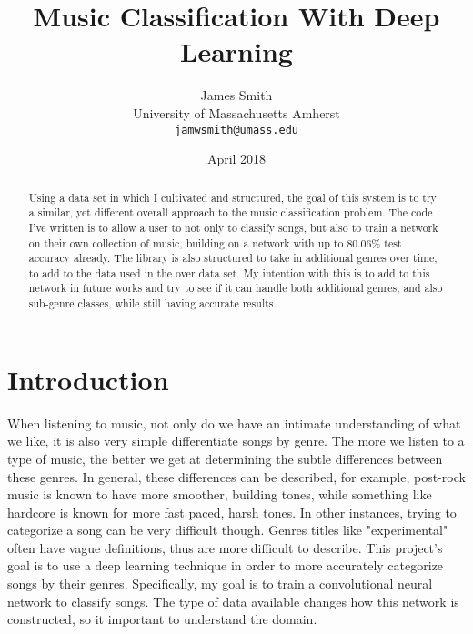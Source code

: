 \documentclass[10pt,twocolumn,letterpaper]{article}
\begin{document}
\title{Music Classification With Deep Learning}
\date{April 2018}

\author{James Smith\\
University of Massachusetts Amherst\\
{\tt\small jamwsmith@umass.edu}
}

\maketitle
\begin{abstract}
   Using a data set in which I cultivated and structured, the goal of this system is to try a similar, yet different overall approach to the music classification problem. The code I've written is to allow a user to not only to classify songs, but also to train a network on their own collection of music, building on a network with up to 80.06\% test accuracy already. The library is also structured to take in additional genres over time, to add to the data used in the over data set. My intention with this is to add to this network in future works and try to see if it can handle both additional genres, and also sub-genre classes, while still having accurate results. 
\end{abstract}


\section{Introduction}
When listening to music, not only do we have an intimate understanding of what we like, it is also very simple differentiate songs by genre. The more we listen to a type of music, the better we get at determining the subtle differences between these genres. In general, these differences can be described, for example, post-rock music is known to have more smoother, building tones, while something like hardcore is known for more fast paced, harsh tones. In other instances, trying to categorize a song can be very difficult though. Genres titles like "experimental" often have vague definitions, thus are more difficult to describe. This project's goal is to use a deep learning technique in order to more accurately categorize songs by their genres. Specifically, my goal is to train a convolutional neural network to classify songs. The type of data available changes how this network is constructed, so it important to understand the domain.
\end{document}
